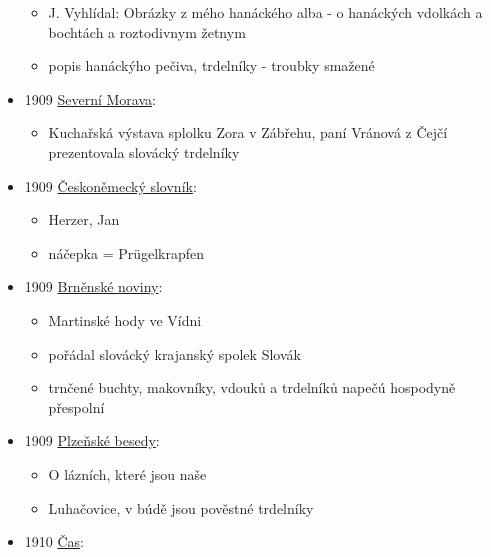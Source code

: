 \begin{itemize}
  \begin{itemize}
  \tightlist
  \item
    J. Vyhlídal: Obrázky z mého hanáckého alba - o hanáckých vdolkách a
    bochtách a roztodivnym žetnym
  \item
    popis hanáckýho pečiva, trdelníky - troubky smažené
  \end{itemize}
\item
  1909
  \href{https://www.digitalniknihovna.cz/vkol/uuid/uuid:8de01b83-a076-483b-b755-bd2e9de6e830}{Severní
  Morava}:

  \begin{itemize}
  \tightlist
  \item
    Kuchařská výstava splolku Zora v Zábřehu, paní Vránová z Čejčí
    prezentovala slovácký trdelníky
  \end{itemize}
\item
  1909
  \href{https://ceskadigitalniknihovna.cz/uuid/uuid:a6ed5320-aa9f-11e3-bb86-005056825209}{Českoněmecký
  slovník}:

  \begin{itemize}
  \tightlist
  \item
    Herzer, Jan
  \item
    náčepka = Prügelkrapfen
  \end{itemize}
\item
  1909
  \href{https://ceskadigitalniknihovna.cz/uuid/uuid:c455e0f0-cd7f-11e3-b110-005056827e51}{Brněnské
  noviny}:

  \begin{itemize}
  \tightlist
  \item
    Martinské hody ve Vídni
  \item
    pořádal slovácký krajanský spolek Slovák
  \item
    trnčené buchty, makovníky, vdouků a trdelníků napečú hospodyně
    přespolní
  \end{itemize}
\item
  1909
  \href{https://ceskadigitalniknihovna.cz/uuid/uuid:649fe960-411f-47df-9f66-f407e20f9b16}{Plzeňské
  besedy}:

  \begin{itemize}
  \tightlist
  \item
    O lázních, které jsou naše
  \item
    Luhačovice, v búdě jsou pověstné trdelníky
  \end{itemize}
\item
  1910
  \href{https://ceskadigitalniknihovna.cz/view/uuid:b06a8860-7d9d-11e9-85ec-005056825209?page=uuid\%3Ab3e88f80-7e35-11e9-b171-5ef3fc9ae867&fulltext=trdeln\%C3\%ADk\%20OR\%20trdeln\%C3\%ADky\%20OR\%20trdeln\%C3\%ADk\%C5\%AF&source=nkp}{Čas}:


\end{itemize}
